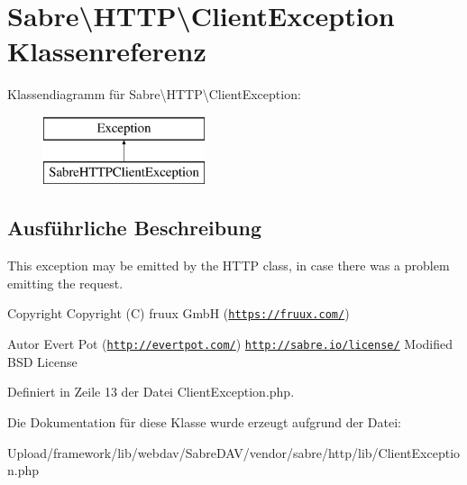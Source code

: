 \hypertarget{class_sabre_1_1_h_t_t_p_1_1_client_exception}{}\section{Sabre\textbackslash{}H\+T\+TP\textbackslash{}Client\+Exception Klassenreferenz}
\label{class_sabre_1_1_h_t_t_p_1_1_client_exception}
Klassendiagramm für Sabre\textbackslash{}H\+T\+TP\textbackslash{}Client\+Exception\+:\begin{figure}[H]
\begin{center}
\leavevmode
\includegraphics[height=2.000000cm]{class_sabre_1_1_h_t_t_p_1_1_client_exception}
\end{center}
\end{figure}


\subsection{Ausführliche Beschreibung}
This exception may be emitted by the H\+T\+TP class, in case there was a problem emitting the request.

\begin{DoxyCopyright}{Copyright}
Copyright (C) fruux GmbH (\href{https://fruux.com/}{\tt https\+://fruux.\+com/}) 
\end{DoxyCopyright}
\begin{DoxyAuthor}{Autor}
Evert Pot (\href{http://evertpot.com/}{\tt http\+://evertpot.\+com/})  \href{http://sabre.io/license/}{\tt http\+://sabre.\+io/license/} Modified B\+SD License 
\end{DoxyAuthor}


Definiert in Zeile 13 der Datei Client\+Exception.\+php.



Die Dokumentation für diese Klasse wurde erzeugt aufgrund der Datei\+:\begin{DoxyCompactItemize}
\item 
Upload/framework/lib/webdav/\+Sabre\+D\+A\+V/vendor/sabre/http/lib/Client\+Exception.\+php\end{DoxyCompactItemize}
